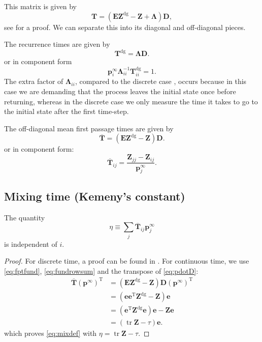 \documentclass[9pt,twocolumn,twoside,lineno]{pnas-new}
\DeclareMathOperator{\tr}{tr}
\newcommand{\inv}{^{-1}}
\newcommand{\dg}{^\mathrm{dg}}
\newcommand{\trans}{^\mathrm{T}}
\newcommand{\onev}{\mathbf{e}}
\newcommand{\onem}{\mathbf{E}}
\newcommand{\prob}{\mathbf{p}}
\newcommand{\eq}{\prob^\infty}
\newcommand{\fpt}{\mathbf{T}}
\newcommand{\fptb}{\overline{\fpt}}
\newcommand{\fund}{\mathbf{Z}}
\newcommand{\D}{\mathbf{D}}
\newcommand{\Lb}{\boldsymbol{\Lambda}}
\begin{document}
\begin{strip}
This matrix is given by
%
\begin{equation}\label{eq:fpt}
  \fpt=(\onem\fund\dg - \fund + \Lb)\D,
\end{equation}
%
see \cite{Yao1985fpt} for a proof.
We can separate this into its diagonal and off-diagonal pieces.

The recurrence times are given by
%
\begin{equation}\label{eq:recurtime}
  \fpt\dg = \Lb\D.
\end{equation}
%
or in component form
%
\begin{equation*}
  \eq_i \Lb_{ii}\inv \fpt\dg_{ii} = 1.
\end{equation*}
%
The extra factor of $\Lb_{ii}$, compared to the discrete case \cite[Th.4.4.5]{kemeny1960finite}, occurs because in this case we are demanding that the process leaves the initial state once before returning, whereas in the discrete case we only measure the time it takes to go to the initial state after the first time-step.

The off-diagonal mean first passage times are given by
%
\begin{equation}\label{eq:fptfund}
  \fptb = (\onem\fund\dg - \fund)\D.
\end{equation}
%
or in component form:
%
\begin{equation}\label{eq:fptfundcmpt}
  \fptb_{ij} = \frac{\fund_{jj}-\fund_{ij}}{\eq_j}.
\end{equation}
%

\subsection{Mixing time (Kemeny's constant)}\label{sec:mixtime}

\begin{thm} \mbox{}\label{th:kemenyconst}
  The quantity
  \begin{equation}\label{eq:mixdef}
    \eta \equiv \sum_j \fptb_{ij}\eq_j
  \end{equation}
  is independent of $i$.
\end{thm}
\begin{proof}
  For discrete time, a proof can be found in \cite[Th.4.4.10]{kemeny1960finite}.
  For continuous time, we use \cref{eq:fptfund}, \cref{eq:fundrowsum} and the transpose of \cref{eq:pdotD}:
  \begin{equation*}
    \begin{aligned}
      \fptb (\eq)\trans &= (\onem\fund\dg - \fund) \D (\eq)\trans \\
        &= (\onev\onev\trans\fund\dg - \fund) \onev \\
        &= (\onev\trans\fund\dg\onev)\onev - \fund\onev \\
        &= (\tr\fund - \tau)\onev.
    \end{aligned}
  \end{equation*}
  which proves \cref{eq:mixdef} with $\eta = \tr\fund - \tau$.
\end{proof}


\end{strip}
\end{document}
